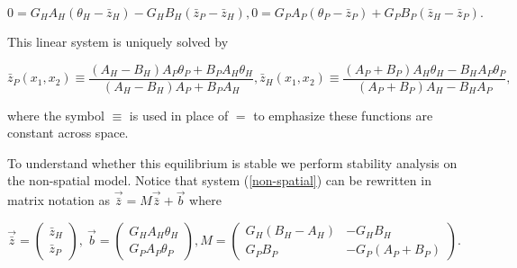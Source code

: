 \documentclass{article}
\begin{document}
\begin{subequations}
  \begin{equation}
    0=G_HA_H(\theta_H-\bar z_H)-G_HB_H(\bar z_P-\bar z_H),
  \end{equation}
  \begin{equation}
    0=G_PA_P(\theta_P-\bar z_P)+G_PB_P(\bar z_H-\bar z_P).
  \end{equation}
\end{subequations}

This linear system is uniquely solved by

\begin{subequations}\label{non-spatial-eq}
  \begin{equation}
    \bar z_P(x_1,x_2)\equiv\frac{(A_H-B_H)A_P\theta_P+B_PA_H\theta_H}{(A_H-B_H)A_P+B_PA_H},
  \end{equation}
  \begin{equation}
    \bar z_H(x_1,x_2)\equiv\frac{(A_P+B_P)A_H\theta_H-B_HA_P\theta_P}{(A_P+B_P)A_H-B_HA_P},
  \end{equation}
\end{subequations}

where the symbol \(\equiv\) is used in place of \(=\) to emphasize these
functions are constant across space.

To understand whether this equilibrium is stable we perform stability
analysis on the non-spatial model. Notice that system
(\ref{non-spatial}) can be rewritten in matrix notation as
\(\vec{\bar z}=M\vec{\bar z}+\vec b\) where

\begin{subequations}
  \begin{equation}
    \vec{\bar z}=\left(\begin{matrix}
      \bar z_H \\ \bar z_P
    \end{matrix}\right), \ 
    \vec b =\left(\begin{matrix}
      G_HA_H\theta_H \\ G_PA_P\theta_P
    \end{matrix}\right),
  \end{equation}
  \begin{equation}
    M=\left(\begin{matrix}
      G_H(B_H-A_H) & -G_HB_H \\
      G_PB_P & -G_P(A_P+B_P)
    \end{matrix}\right).
  \end{equation}
\end{subequations}
\end{document}
